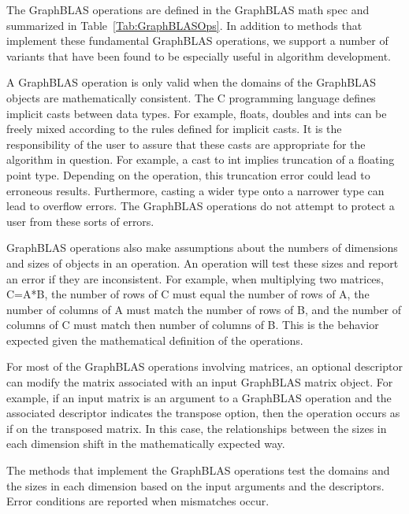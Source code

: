 The GraphBLAS operations are defined in the GraphBLAS math spec and summarized in 
Table~\ref{Tab:GraphBLASOps}.   In addition to methods that implement these fundamental GraphBLAS 
operations, we support a number of variants that have been found to be especially useful in 
algorithm development.

A GraphBLAS operation is only valid when the domains of the GraphBLAS objects are mathematically
consistent.  The C programming language defines implicit casts between data types.  For example, floats,
doubles and ints can be freely mixed according to the rules defined for implicit casts.  It is the responsibility of
the user to assure that these casts are appropriate for the algorithm in question.  For example, a cast to int
implies truncation of a floating point type.  Depending on the operation, this truncation error could lead to erroneous
results.  Furthermore, casting a wider type onto a narrower type can lead to overflow errors.  The GraphBLAS
operations do not attempt to protect a user from these sorts of errors.

GraphBLAS operations also make assumptions about the numbers of dimensions and sizes of objects in
an operation.   An operation will test these sizes and report an error if they are inconsistent.  For example, 
when multiplying two matrices, C=A*B, the number of rows of C must equal the number of rows of A, the number of
columns of A must match the number of rows of B, and the number of columns of C must match then number
of columns of B.  This is the behavior expected given the mathematical definition of the operations.   

For most of the GraphBLAS operations involving matrices, an optional descriptor can modify the matrix
associated with an input GraphBLAS matrix object.  For example, if an input matrix is an argument to a GraphBLAS
operation and the associated descriptor indicates the transpose option, then the operation occurs as if on the 
transposed matrix.  In this case, the relationships between the sizes in each dimension shift in the mathematically 
expected way. 

The methods that implement the GraphBLAS operations test the domains and the sizes in each dimension based
on the input arguments and the descriptors.  Error conditions are reported when mismatches occur.


%

